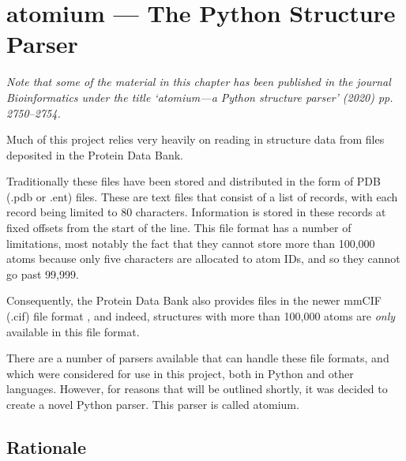 


\chapter{atomium --- The Python Structure Parser} %
\label{Chapter3}


\emph{Note that some of the material in this chapter has been published in the journal Bioinformatics under the title `atomium—a Python structure parser' (2020) pp. 2750--2754.} \cite{ireland2020}

Much of this project relies very heavily on reading in structure data from files deposited in the Protein Data Bank.

Traditionally these files have been stored and distributed in the form of PDB (.pdb or .ent) files. These are text files that consist of a list of records, with each record being limited to 80 characters. Information is stored in these records at fixed offsets from the start of the line. This file format has a number of limitations, most notably the fact that they cannot store more than 100,000 atoms because only five characters are allocated to atom IDs, and so they cannot go past 99,999.

Consequently, the Protein Data Bank also provides files in the newer mmCIF (.cif) file format \cite{hall1991mmcif}, and indeed, structures with more than 100,000 atoms are \emph{only} available in this file format.

There are a number of parsers available that can handle these file formats, and which were considered for use in this project, both in Python and other languages. However, for reasons that will be outlined shortly, it was decided to create a novel Python parser. This parser is called atomium.

\section{Rationale}

